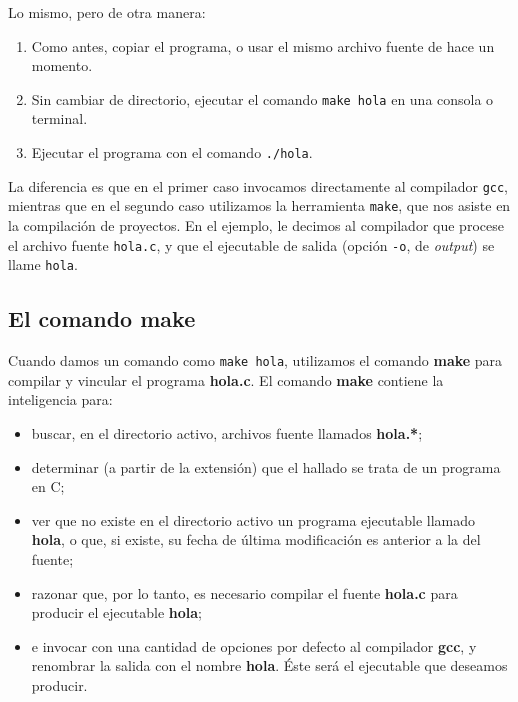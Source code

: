 Lo mismo, pero de otra manera: 

\begin{enumerate}
	\item Como antes, copiar el programa, o usar el mismo archivo fuente de hace un momento.
	\item Sin cambiar de directorio, ejecutar el comando \lstinline{make hola} en una consola o terminal.
	\item Ejecutar el programa con el comando \lstinline{./hola}. 
\end{enumerate}

La diferencia es que en el primer caso invocamos directamente al compilador \lstinline{gcc},
mientras que en el segundo caso utilizamos la herramienta \lstinline{make}, que nos asiste en la compilación de proyectos. En el ejemplo, le decimos al compilador que procese el archivo fuente \lstinline{hola.c}, y que el ejecutable de salida (opción \lstinline{-o}, de \textit{output}) se llame \lstinline{hola}. 



\subsection{El comando make}
Cuando damos un comando como \lstinline{make hola}, utilizamos el comando \textbf{make} para compilar y vincular el programa \textbf{hola.c}. El comando \textbf{make} contiene la inteligencia para:
\begin{itemize}
 	\item buscar, en el directorio activo, archivos fuente llamados \textbf{hola.*}; 
 	\item determinar (a partir de la extensión) que el hallado se trata de un programa en C;
 	\item ver que no existe en el directorio activo un programa ejecutable llamado \textbf{hola}, o que, si existe, su fecha de última modificación es anterior a la del fuente;
 	\item razonar que, por lo tanto, es necesario compilar el fuente \textbf{hola.c} para producir el ejecutable \textbf{hola};  
 	\item e invocar con una cantidad de opciones por defecto al compilador \textbf{gcc}, y renombrar la salida con el nombre
\textbf{hola}. Éste será el ejecutable que deseamos producir.
\end{itemize} 

